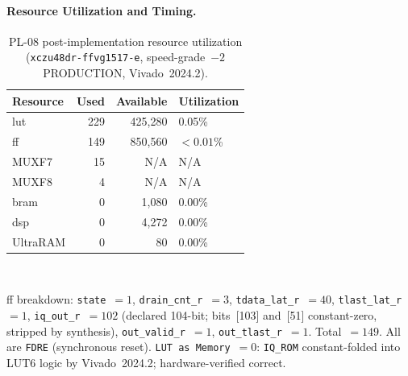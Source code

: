 \paragraph{Resource Utilization and Timing.}
\leavevmode\par
\begin{table}[!h]
  \caption{PL-08 post-implementation resource utilization
           (\texttt{xczu48dr\allowbreak-ffvg1517\allowbreak-e}, speed-grade~$-2$
           PRODUCTION, Vivado~2024.2).}
  \label{tab:pl08_resources}
  \centering
  \begin{tabular}{lrrl}
    \hline
    Resource     & Used  & Available  & Utilization \\
    \hline
    \ac{lut}     &  229  & 425{,}280  & 0.05\%      \\[2pt]
    \ac{ff}      &  149  & 850{,}560  & $<0.01$\%   \\[2pt]
    MUXF7        &   15  & N/A        & N/A          \\[2pt]
    MUXF8        &    4  & N/A        & N/A          \\[2pt]
    \ac{bram}    &    0  & 1{,}080    & 0.00\%      \\[2pt]
    \ac{dsp}     &    0  & 4{,}272    & 0.00\%      \\[2pt]
    UltraRAM     &    0  & 80         & 0.00\%      \\
    \hline
  \end{tabular}\\[4pt]
  \begin{minipage}{\linewidth}
    \small
    \ac{ff} breakdown: \texttt{state}~$= 1$, \texttt{drain\_cnt\_r}~$= 3$,
    \texttt{tdata\_lat\_r}~$= 40$, \texttt{tlast\_lat\_r}~$= 1$,
    \texttt{iq\_out\_r}~$= 102$ (declared 104-bit; bits~[103] and~[51]
    constant-zero, stripped by synthesis), \texttt{out\_valid\_r}~$= 1$,
    \texttt{out\_tlast\_r}~$= 1$. Total~$= 149$. All are \texttt{FDRE}
    (synchronous reset). \texttt{LUT as Memory}~$= 0$: \texttt{IQ\_ROM}
    constant-folded into LUT6 logic by Vivado~2024.2; hardware-verified correct.
  \end{minipage}
\end{table}

